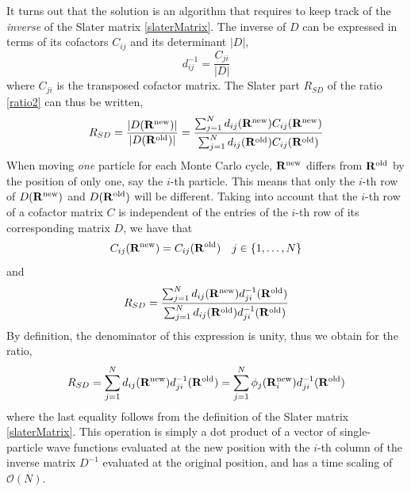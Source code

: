 \documentclass[english, a4paper]{article}
\begin{document}
\noindent It turns out that the solution is an algorithm that requires to keep track of the \textit{inverse}
of the Slater matrix \eqref{slaterMatrix}. The inverse of $D$ can be expressed in terms of its cofactors $C_{ij}$ and its
determinant $|D|$,
\begin{equation}
 d_{ij}^{-1} = \frac{C_{ji}}{|D|}
\end{equation}
where $C_{ji}$ is the transposed cofactor matrix. 
The Slater part $R_{SD}$ of the ratio \eqref{ratio2} can thus be written,
\begin{equation}
 R_{SD} = \frac{|D({\bf R}^{\textrm{new}})|}{|D({\bf R}^{\textrm{old}})|}
  = \frac{\sum_{j=1}^N d_{ij}({\bf R}^{\textrm{new}}) C_{ij}({\bf R}^{\textrm{new}})}
  {\sum_{j=1}^N d_{ij}({\bf R}^{\textrm{old}}) C_{ij}({\bf R}^{\textrm{old}})}
\end{equation}
When moving \textit{one} particle for each Monte Carlo cycle, ${\bf R}^{\textrm{new}}$ differs from 
${\bf R}^{\textrm{old}}$ by the position of only one, say the $i$-th particle. This means that
only the $i$-th row of $D({\bf R}^{\textrm{new}})$
and $D({\bf R}^{\textrm{old}})$ will be different. Taking into account that the $i$-th row of a cofactor matrix
$C$ is independent of the entries of the $i$-th row of its corresponding matrix $D$, we have that
\begin{equation}
 C_{ij}({\bf R}^{\textrm{new}}) = C_{ij}({\bf R}^{\textrm{old}}) \quad j \in \{1,\dots,N\}
\end{equation}
and
\begin{equation}
 R_{SD} = \frac{\sum_{j=1}^N d_{ij}({\bf R}^{\textrm{new}}) d_{ji}^{-1}({\bf R}^{\textrm{old}})}
  {\sum_{j=1}^N d_{ij}({\bf R}^{\textrm{old}}) d_{ji}^{-1}({\bf R}^{\textrm{old}})}
\end{equation}
By definition, the denominator of this expression is unity, thus we obtain for the ratio,
\begin{equation}
 R_{SD} = \sum_{j=1}^N d_{ij}({\bf R}^{\textrm{new}}) d_{ji}^{-1}({\bf R}^{\textrm{old}})
        = \sum_{j=1}^N \phi_j({\bf R}_i^{\textrm{new}}) d_{ji}^{-1}({\bf R}^{\textrm{old}})
        \label{slaterRatio}
\end{equation}
where the last equality follows from the definition of the Slater matrix \eqref{slaterMatrix}. 
This operation is simply a dot product of a vector of single-particle wave functions evaluated
at the new position with the $i$-th column of the inverse matrix $D^{-1}$ evaluated at the original position,
and has a time scaling of $\mathcal{O}(N)$.\\
\end{document}
